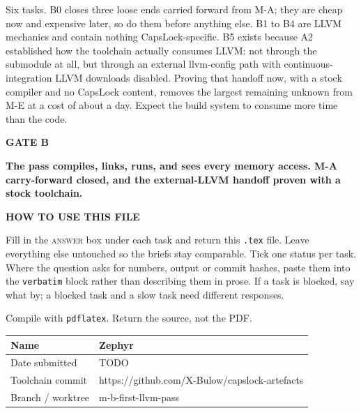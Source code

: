 \documentclass[11pt,a4paper]{article}
\begin{document}
\thispagestyle{fancy}

\par\vspace{2pt}

\par\vspace{8pt}

\begin{notebox}
Six tasks. B0 closes three loose ends carried forward from M-A; they are cheap now and expensive later, so do them before anything else. B1 to B4 are LLVM mechanics and contain nothing CapsLock-specific. B5 exists because A2 established how the toolchain actually consumes LLVM: not through the submodule at all, but through an external llvm-config path with continuous-integration LLVM downloads disabled. Proving that handoff now, with a stock compiler and no CapsLock content, removes the largest remaining unknown from M-E at a cost of about a day. Expect the build system to consume more time than the code.
\end{notebox}

\begin{gatebox}
{\scriptsize\bfseries\color{mute}GATE B}\par\vspace{2pt}
{\bfseries The pass compiles, links, runs, and sees every memory access. M-A carry-forward closed, and the external-LLVM handoff proven with a stock toolchain.}
\end{gatebox}

\begin{notebox}
{\scriptsize\bfseries\color{mute}HOW TO USE THIS FILE}\par\vspace{3pt}
Fill in the \textsc{answer} box under each task and return this \texttt{.tex} file. Leave everything else untouched so the briefs stay comparable. Tick one status per task. Where the question asks for numbers, output or commit hashes, paste them into the \texttt{verbatim} block rather than describing them in prose. If a task is blocked, say what by; a blocked task and a slow task need different responses.\par\vspace{4pt}
{\scriptsize\color{mute}Compile with \texttt{pdflatex}. Return the source, not the PDF.}
\end{notebox}

\vspace{4pt}
\noindent\begin{tabular}{@{}p{34mm}p{120mm}@{}}
\hline
{\footnotesize\color{mute}Name} & \rule{0pt}{4.4mm} Zephyr \\
\hline
{\footnotesize\color{mute}Date submitted} & \rule{0pt}{4.4mm} TODO \\
\hline
{\footnotesize\color{mute}Toolchain commit} & \rule{0pt}{4.4mm} https://github.com/X-Bulow/capslock-artefacts \\
\hline
{\footnotesize\color{mute}Branch / worktree} & \rule{0pt}{4.4mm} m-b-first-llvm-pass \\
\hline
\end{tabular}
\vspace{6pt}
\end{document}

